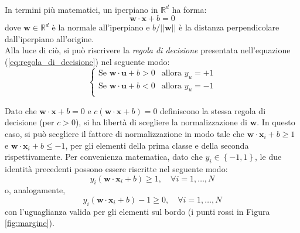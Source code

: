 \\
In termini più matematici, un iperpiano in $\mathbb{R}^d$ ha forma:
\begin{equation}
\label{eq:iperpiano}
\mathbf{w}\cdot\mathbf{x}+b=0
\end{equation}
dove $\mathbf{w}\in\mathbb{R}^d$ è la normale all'iperpiano e $b/ \vert\vert\mathbf{w}\vert\vert$ è la distanza perpendicolare dall'iperpiano all'origine.
\\
Alla luce di ciò, si può riscrivere la \textit{regola di decisione} presentata nell'equazione (\ref{eq:regola_di_decisione}) nel seguente modo:
\begin{equation}
\label{eq:regola_di_decisioneSVM}
\left\{
		\begin{array}{ll}
			\text{Se } \mathbf{w}\cdot\mathbf{u}+b>0 & \mbox{allora } y_u=+1 \\
			\text{Se } \mathbf{w}\cdot\mathbf{u}+b<0 & \mbox{allora } y_u=-1 \\
		\end{array}
	\right.
\end{equation}

Dato che $\mathbf{w}\cdot\mathbf{x}+b=0$ e $c\left (\mathbf{w}\cdot\mathbf{x}+b\right )=0$ definiscono la stessa regola di decisione (per $c>0$), si ha libertà di scegliere la normalizzazione di $\mathbf{w}$.
In questo caso, si può scegliere il fattore di normalizzazione in modo tale che $\mathbf{w}\cdot\mathbf{x}_i+b\geq 1$ e $\mathbf{w}\cdot\mathbf{x}_i+b\leq-1$, per gli elementi della prima classe e della seconda rispettivamente.
Per convenienza matematica, dato che $y_i\in\left\lbrace -1,1\right\rbrace$, le due identità precedenti possono essere riscritte nel seguente modo:
\begin{equation}
\label{eq:disq_elementi1}
y_i\left (\mathbf{w}\cdot\mathbf{x}_i+b\right )\geq1,\quad \forall i=1,\ldots,N
\end{equation}
o, analogamente,
\begin{equation}
\label{eq:disq_elementi2}
y_i\left (\mathbf{w}\cdot\mathbf{x}_i+b\right )-1\geq0,\quad \forall i=1,\ldots,N
\end{equation}
con l'uguaglianza valida per gli elementi sul bordo (i punti rossi in Figura \ref{fig:margine}).
\\

